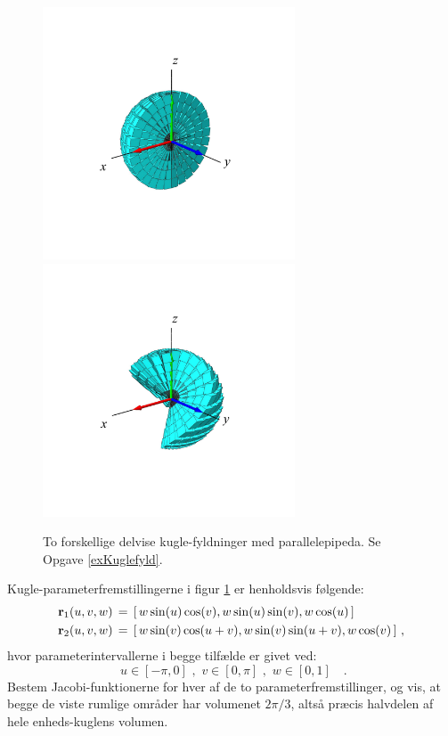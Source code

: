 \begin{figure}[h]
\centerline{\includegraphics[height=75mm]{FIGS/plotSphereFillA3} \quad \includegraphics[height=75mm]{FIGS/plotSphereFillB3}}
\begin{center}
\caption{\small{To forskellige delvise kugle-fyldninger med parallelepipeda. Se Opgave \ref{exKuglefyld}.
}} \label{figSphereFillB}
\end{center}
\end{figure}



\begin{exercise} \label{exKuglefyld}
Kugle-parameterfremstillingerne i figur \ref{figSphereFillB} er henholdsvis følgende:
\begin{equation*}\begin{aligned}
{\bf r}_{1}(u, v, w) \, &= \, [\, w\sin(u)\cos(v), w\sin(u)\sin(v), w\cos(u)\,]  \\
{\bf r}_{2}(u, v, w) \, &= \, [\,w\sin(v)\cos(u+v), w\sin(v)\sin(u+v), w\cos(v) \,] \,\, ,
\end{aligned}
\end{equation*}
hvor parameterintervallerne i begge tilfælde er givet ved:
$$
\,\, u \in
[-\pi, 0]\,\, , \, \, v \in
[0, \pi]\,\, , \, \, w \in [0, 1] \quad .
$$
Bestem Jacobi-funktionerne for hver af de to parameterfremstillinger,
og vis, at begge de viste rumlige områder har volumenet $2\pi/3$, altså præcis halvdelen af
hele enheds-kuglens volumen.
\end{exercise}







